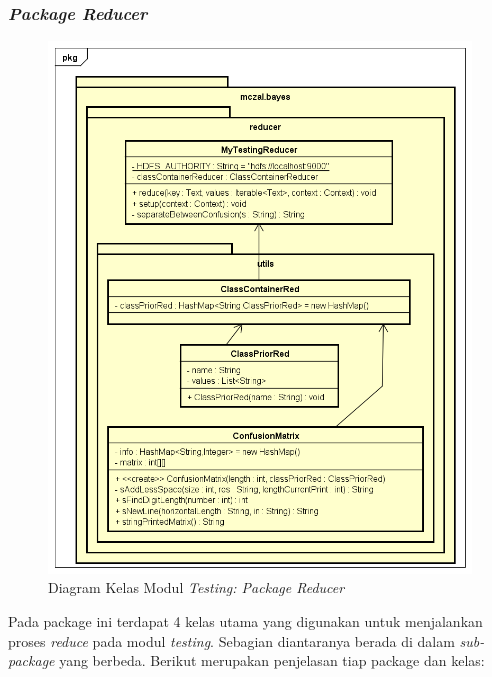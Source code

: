 \subsubsection{\textit{Package Reducer}}
\begin{figure}[H]
	\centering
	\includegraphics[scale=0.7]{ClassDiagramLengkap/CD_Test_Reducer}
	\caption[Diagram Kelas Modul \textit{Testing: Package Reducer}]{Diagram Kelas Modul \textit{Testing: Package Reducer}}
	\label{fig:Diagram Kelas Modul Testing: Package Reducer}
\end{figure}
Pada package ini terdapat 4 kelas utama yang digunakan untuk menjalankan proses \textit{reduce} pada modul \textit{testing}. Sebagian diantaranya berada di dalam \textit{sub-package} yang berbeda. Berikut merupakan penjelasan tiap package dan kelas:


